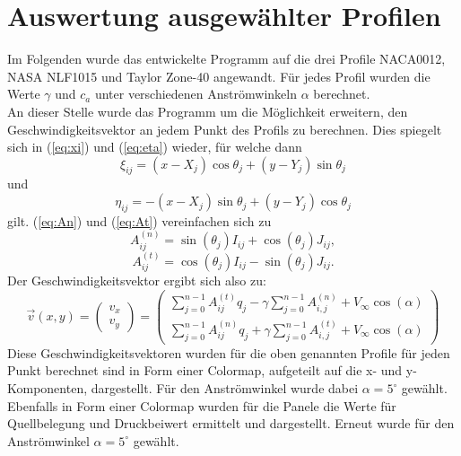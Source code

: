 \section{Auswertung ausgewählter Profilen}
Im Folgenden wurde das entwickelte Programm auf die drei Profile NACA0012, NASA NLF1015 und Taylor Zone-40 angewandt. Für jedes Profil wurden die Werte $\gamma$ und $c_a$ unter verschiedenen Anströmwinkeln $\alpha $ berechnet. \\
An dieser Stelle wurde das Programm um die Möglichkeit erweitern, den Geschwindigkeitsvektor an jedem Punkt des Profils zu berechnen. Dies spiegelt sich in (\ref{eq:xi}) und (\ref{eq:eta}) wieder, für welche dann
\begin{equation}
\xi_{ij} =  (x - X_j) \cos \theta _j + (y - Y_j) \sin \theta _j
\end{equation}
und
\begin{equation}
\eta_{ij} =  -(x - X_j) \sin \theta _j + (y - Y_j) \cos \theta _j
\end{equation}
gilt. (\ref{eq:An}) und (\ref{eq:At}) vereinfachen sich zu
\begin{equation}
A_{ij}^{(n)} = \sin {(\theta _j)} I_{ij} + \cos{( \theta _j)} J_{ij},
\end{equation}
\begin{equation}
A_{ij}^{(t)} =  \cos{(\theta _j)} I_{ij} - \sin{( \theta _j)} J_{ij}.
\end{equation}
Der Geschwindigkeitsvektor ergibt sich also zu:
\begin{equation}
\vec v (x,y) = 
\begin{pmatrix}
v_x \\
v_y
\end{pmatrix}
=
\begin{pmatrix}
\sum_{j=0}^{n-1} A_{ij}^{(t)} q_j - \gamma \sum_{j=0}^{n-1}A_{i,j}^{(n)} + V_{\infty} \cos{(\alpha)} \\
\sum_{j=0}^{n-1} A_{ij}^{(n)} q_j + \gamma \sum_{j=0}^{n-1}A_{i,j}^{(t)} + V_{\infty} \cos{(\alpha)}
\end{pmatrix}
\end{equation}
Diese Geschwindigkeitsvektoren wurden für die oben genannten Profile für jeden Punkt berechnet sind in Form einer Colormap, aufgeteilt auf die x- und y-Komponenten, dargestellt. Für den Anströmwinkel wurde dabei $\alpha =5^{\circ}$ gewählt. \\
Ebenfalls in Form einer Colormap wurden für die Panele die Werte für Quellbelegung und Druckbeiwert ermittelt und dargestellt. Erneut wurde für den Anströmwinkel $\alpha =5^{\circ}$ gewählt.

